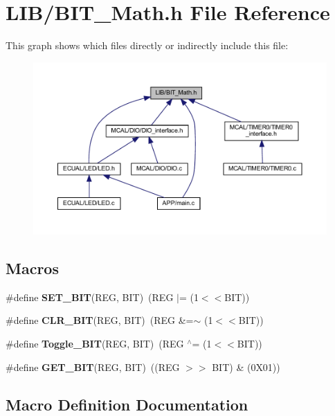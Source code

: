 \section{L\+I\+B/\+B\+I\+T\+\_\+\+Math.h File Reference}
\label{_b_i_t___math_8h}
This graph shows which files directly or indirectly include this file\+:\nopagebreak
\begin{figure}[H]
\begin{center}
\leavevmode
\includegraphics[width=350pt]{_b_i_t___math_8h__dep__incl}
\end{center}
\end{figure}
\subsection*{Macros}
\begin{DoxyCompactItemize}
\item 
\#define \textbf{ S\+E\+T\+\_\+\+B\+IT}(R\+EG,  B\+IT)~(R\+EG $\vert$= (1$<$$<$B\+IT))
\item 
\#define \textbf{ C\+L\+R\+\_\+\+B\+IT}(R\+EG,  B\+IT)~(R\+EG \&=$\sim$ (1$<$$<$B\+IT))
\item 
\#define \textbf{ Toggle\+\_\+\+B\+IT}(R\+EG,  B\+IT)~(R\+EG $^\wedge$= (1$<$$<$B\+IT))
\item 
\#define \textbf{ G\+E\+T\+\_\+\+B\+IT}(R\+EG,  B\+IT)~((R\+EG $>$$>$ B\+IT) \& (0\+X01))
\end{DoxyCompactItemize}


\subsection{Macro Definition Documentation}
\mbox{\label{_b_i_t___math_8h_a96fae2c0e48fd3f85b2438aa61ba4550}} 
